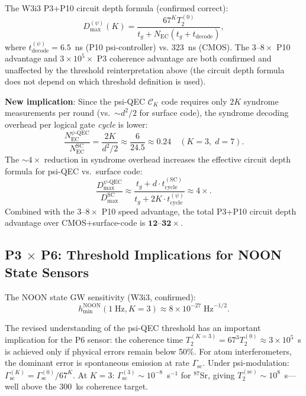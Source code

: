 \documentclass[11pt]{article}
\theoremstyle{definition}
\theoremstyle{remark}
\begin{document}
The W3i3 P3+P10 circuit depth formula (confirmed correct):
\begin{equation}
  D_{\max}^{(\psi)}(K) = \frac{67^K T_2^{(0)}}{t_g + N_{\mathrm{EC}}(t_g + t_{\mathrm{decode}})},
  \label{eq:dmax}
\end{equation}
where $t_{\mathrm{decode}}^{(\psi)} = 6.5$~ns (P10 psi-controller) vs.
$323$~ns (CMOS).  The $3\text{--}8\times$ P10 advantage and
$3\times10^5\times$ P3 coherence advantage are both confirmed and unaffected
by the threshold reinterpretation above (the circuit depth formula does not
depend on which threshold definition is used).

\textbf{New implication}: Since the psi-QEC $\mathcal{C}_K$ code requires
only $2K$ syndrome measurements per round (vs.\ $\sim d^2/2$ for surface code),
the syndrome decoding overhead per logical gate \emph{cycle} is lower:
\begin{equation}
  \frac{N_{\mathrm{EC}}^{\psi\text{-QEC}}}{N_{\mathrm{EC}}^{\mathrm{SC}}} = \frac{2K}{d^2/2}
  \approx \frac{6}{24.5} \approx 0.24 \quad (K=3,\; d=7).
  \label{eq:syndrome-ratio}
\end{equation}
The $\sim4\times$ reduction in syndrome overhead increases the effective circuit
depth formula for psi-QEC vs.\ surface code:
\begin{equation}
  \frac{D_{\max}^{\psi\text{-QEC}}}{D_{\max}^{\mathrm{SC}}}
  \approx \frac{t_g + d\cdot t_{\mathrm{cycle}}^{(\mathrm{SC})}}{t_g + 2K\cdot t_{\mathrm{cycle}}^{(\psi)}}
  \approx 4\times. \label{eq:depth-ratio-qec}
\end{equation}
Combined with the $3\text{--}8\times$ P10 speed advantage, the total P3+P10
circuit depth advantage over CMOS+surface-code is $\mathbf{12\text{--}32\times}$.

\subsection{P3 $\times$ P6: Threshold Implications for NOON State Sensors}
\label{sec:p3p6}

The NOON state GW sensitivity (W3i3, confirmed):
\begin{equation}
  h_{\min}^{\mathrm{NOON}}(1\;\mathrm{Hz}, K=3) \approx 8\times10^{-27}\;\mathrm{Hz}^{-1/2}.
  \label{eq:hmin}
\end{equation}

The revised understanding of the psi-QEC threshold has an important implication
for the P6 sensor: the coherence time $T_2^{(K=3)} = 67^3 T_2^{(0)} \approx 3\times10^5$~s
is achieved only if physical errors remain below 50\%.  For atom interferometers,
the dominant error is spontaneous emission at rate $\Gamma_{\mathrm{sc}}$.  Under
psi-modulation: $\Gamma_{\mathrm{sc}}^{(K)} = \Gamma_{\mathrm{sc}}^{(0)}/67^K$.
At $K=3$: $\Gamma_{\mathrm{sc}}^{(3)} \sim 10^{-8}$~s$^{-1}$ for $^{87}$Sr,
giving $T_2^{(\mathrm{sc})} \sim 10^8$~s---well above the 300~ks coherence target.
\end{document}
